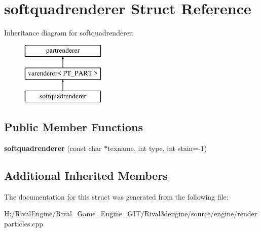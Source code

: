 \hypertarget{structsoftquadrenderer}{}\section{softquadrenderer Struct Reference}
\label{structsoftquadrenderer}
Inheritance diagram for softquadrenderer\+:\begin{figure}[H]
\begin{center}
\leavevmode
\includegraphics[height=3.000000cm]{structsoftquadrenderer}
\end{center}
\end{figure}
\subsection*{Public Member Functions}
\begin{DoxyCompactItemize}
\item 
\mbox{\label{structsoftquadrenderer_ab40895280257cfeecf7c414c4c467b5d}} 
{\bfseries softquadrenderer} (const char $\ast$texname, int type, int stain=-\/1)
\end{DoxyCompactItemize}
\subsection*{Additional Inherited Members}


The documentation for this struct was generated from the following file\+:\begin{DoxyCompactItemize}
\item 
H\+:/\+Rival\+Engine/\+Rival\+\_\+\+Game\+\_\+\+Engine\+\_\+\+G\+I\+T/\+Rival3dengine/source/engine/renderparticles.\+cpp\end{DoxyCompactItemize}
